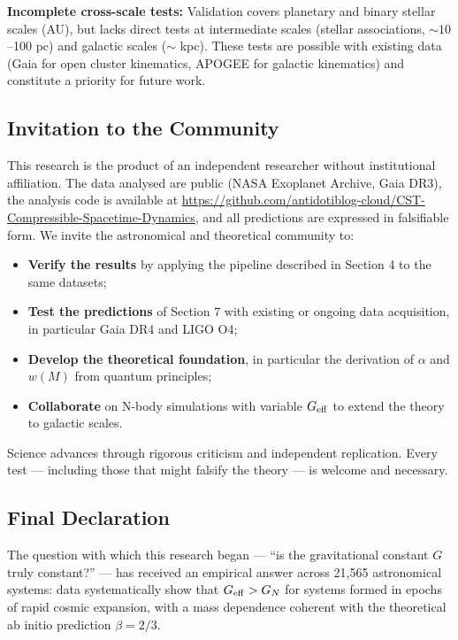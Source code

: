 \documentclass[11pt,a4paper]{article}
\providecommand{\tightlist}{\setlength{\itemsep}{0pt}\setlength{\parskip}{0pt}}
\begin{document}
\textbf{Incomplete cross-scale tests:} Validation covers planetary and
binary stellar scales (AU), but lacks direct tests at intermediate
scales (stellar associations, \(\sim 10\)--100 pc) and galactic scales
(\(\sim\) kpc). These tests are possible with existing data (Gaia for
open cluster kinematics, APOGEE for galactic kinematics) and constitute
a priority for future work.

\hypertarget{invitation-to-the-community}{%
\subsection{Invitation to the
Community}\label{invitation-to-the-community}}

This research is the product of an independent researcher without
institutional affiliation. The data analysed are public (NASA Exoplanet
Archive, Gaia DR3), the analysis code is available at \url{https://github.com/antidotiblog-cloud/CST-Compressible-Spacetime-Dynamics}, and all predictions are expressed in
falsifiable form. We invite the astronomical and theoretical community
to:

\begin{itemize}
\tightlist
\item
  \textbf{Verify the results} by applying the pipeline described in
  Section 4 to the same datasets;
\item
  \textbf{Test the predictions} of Section 7 with existing or ongoing
  data acquisition, in particular Gaia DR4 and LIGO O4;
\item
  \textbf{Develop the theoretical foundation}, in particular the
  derivation of \(\alpha\) and \(w(M)\) from quantum principles;
\item
  \textbf{Collaborate} on N-body simulations with variable
  \(G_{\rm eff}\) to extend the theory to galactic scales.
\end{itemize}

Science advances through rigorous criticism and independent replication.
Every test --- including those that might falsify the theory --- is
welcome and necessary.

\hypertarget{final-declaration}{%
\subsection{Final Declaration}\label{final-declaration}}

The question with which this research began --- ``is the gravitational
constant \(G\) truly constant?'' --- has received an empirical answer
across 21,565 astronomical systems: data systematically show that
\(G_{\rm eff} > G_N\) for systems formed in epochs of rapid cosmic
expansion, with a mass dependence coherent with the theoretical ab
initio prediction \(\beta = 2/3\).
\end{document}
